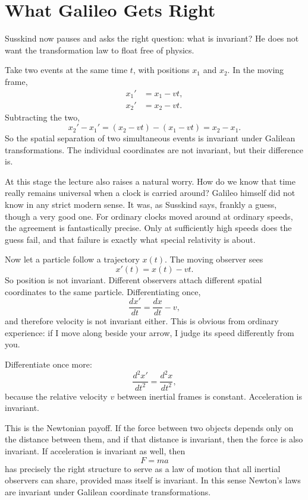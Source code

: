 \section{What Galileo Gets Right}

Susskind now pauses and asks the right question: what is invariant? He does not want the transformation law to float free of physics.

Take two events at the same time \(t\), with positions \(x_1\) and \(x_2\). In the moving frame,
\begin{align}
x_1' &= x_1-vt, \\
x_2' &= x_2-vt.
\end{align}
Subtracting the two,
\begin{equation}
x_2'-x_1'=(x_2-vt)-(x_1-vt)=x_2-x_1.
\end{equation}
So the spatial separation of two simultaneous events is invariant under Galilean transformations. The individual coordinates are not invariant, but their difference is.

At this stage the lecture also raises a natural worry. How do we know that time really remains universal when a clock is carried around? Galileo himself did not know in any strict modern sense. It was, as Susskind says, frankly a guess, though a very good one. For ordinary clocks moved around at ordinary speeds, the agreement is fantastically precise. Only at sufficiently high speeds does the guess fail, and that failure is exactly what special relativity is about.

Now let a particle follow a trajectory \(x(t)\). The moving observer sees
\begin{equation}
x'(t)=x(t)-vt.
\end{equation}
So position is not invariant. Different observers attach different spatial coordinates to the same particle. Differentiating once,
\begin{equation}
\frac{dx'}{dt}=\frac{dx}{dt}-v,
\end{equation}
and therefore velocity is not invariant either. This is obvious from ordinary experience: if I move along beside your arrow, I judge its speed differently from you.

Differentiate once more:
\begin{equation}
\frac{d^2x'}{dt^2}=\frac{d^2x}{dt^2},
\end{equation}
because the relative velocity \(v\) between inertial frames is constant. Acceleration is invariant.

This is the Newtonian payoff. If the force between two objects depends only on the distance between them, and if that distance is invariant, then the force is also invariant. If acceleration is invariant as well, then
\begin{equation}
F=ma
\end{equation}
has precisely the right structure to serve as a law of motion that all inertial observers can share, provided mass itself is invariant. In this sense Newton's laws are invariant under Galilean coordinate transformations.


